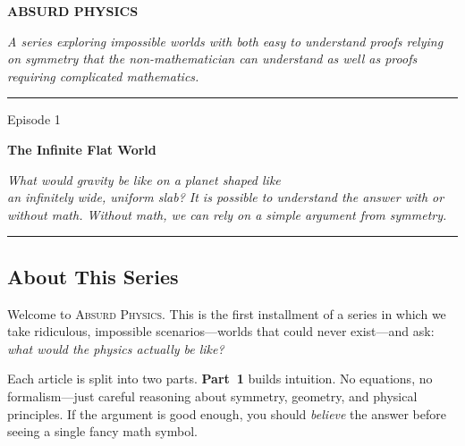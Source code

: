 \documentclass[11pt, letterpaper]{article}
\newcommand{\seriesname}{\textsc{Absurd Physics}}
\begin{document}

\begin{center}
\vspace*{1.5cm}

{\fontsize{36}{42}\selectfont\bfseries\textcolor{accentblue}{ABSURD PHYSICS}}

\vspace{8pt}
{\large\textcolor{seriestitle}{\textit{A series exploring impossible worlds with both easy to understand proofs relying on symmetry that the non-mathematician can understand as well as proofs requiring complicated mathematics.}}}

\vspace{1.5cm}
\rule{0.6\textwidth}{0.5pt}
\vspace{1.5cm}

{\fontsize{24}{30}\selectfont Episode 1}

\vspace{10pt}

{\fontsize{28}{34}\selectfont\bfseries The Infinite Flat World}

\vspace{8pt}
{\large\textit{What would gravity be like on a planet shaped like\\an infinitely wide, uniform slab? It is possible to understand the answer with or without math. Without math, we can rely on a simple argument from symmetry.}}

\vspace{2cm}
\rule{0.6\textwidth}{0.5pt}
\end{center}

\vspace{1cm}

\subsection*{About This Series}

Welcome to \seriesname. This is the first installment of a series in which we take ridiculous, impossible scenarios---worlds that could never exist---and ask: \textit{what would the physics actually be like?}

Each article is split into two parts. \textbf{Part~1} builds intuition. No equations, no formalism---just careful reasoning about symmetry, geometry, and physical principles. If the argument is good enough, you should \textit{believe} the answer before seeing a single fancy math symbol.
\end{document}
